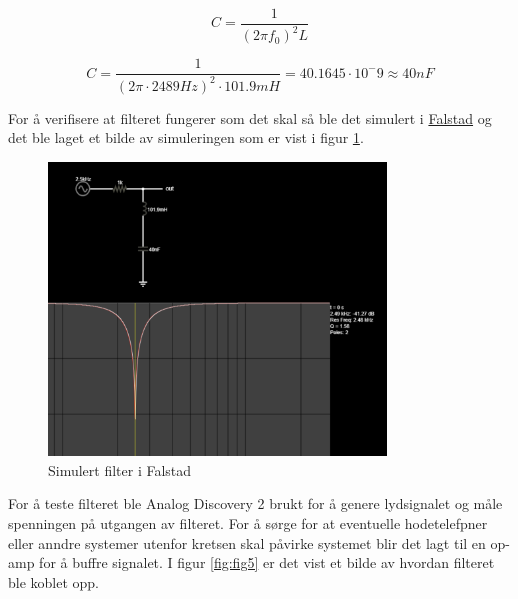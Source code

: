 \begin{equation}
	C = \frac{1}{(2\pi f_0)^2 L}
	\label{eq:2}
\end{equation}

\begin{equation}
	C = \frac{1}{(2\pi \cdot 2489Hz)^2 \cdot 101.9mH} = 40.1645 \cdot 10^-9 \approx 40nF
	\label{eq:3}
\end{equation}

For å verifisere at filteret fungerer som det skal så ble det simulert i \href{https://www.falstad.com/afilter/circuitjs.html?cct=$+1+0.000005+5+50+5+40%0A%25+0+28853.998118144256%0Al+912+208+912+304+0+0.1018+0%0Ac+912+304+912+400+0+4e-8+0%0Ar+800+208+912+208+0+1000%0AO+912+208+976+208+0%0Ag+912+400+912+432+0%0A170+800+208+768+208+3+20+60+5+0.5%0Ao+5+64+0+34+5+0.00009765625+0+-1+in%0Ao+3+64+0+34+5+0.00009765625+1+-1+out%0Ao+0+64+0+34+10+0.025+2+-1+inductor%0Ao+1+64+0+34+10+0.025+2+-1+cap%0A}{Falstad} og det ble laget et bilde av simuleringen som er vist i figur \ref{fig:fig4}.

\begin{figure}[!h]
	\centering
	\includegraphics[width=0.8\textwidth]{Bilder/Falstad_filters.png}
	\caption{Simulert filter i Falstad}
	\label{fig:fig4}
\end{figure}


For å teste filteret ble Analog Discovery 2 brukt for å genere lydsignalet og måle spenningen på utgangen av filteret. For å sørge for at eventuelle hodetelefpner eller anndre systemer utenfor kretsen skal påvirke systemet blir det lagt til en op-amp for å buffre signalet. I figur \ref{fig:fig5} er det vist et bilde av hvordan filteret ble koblet opp.

